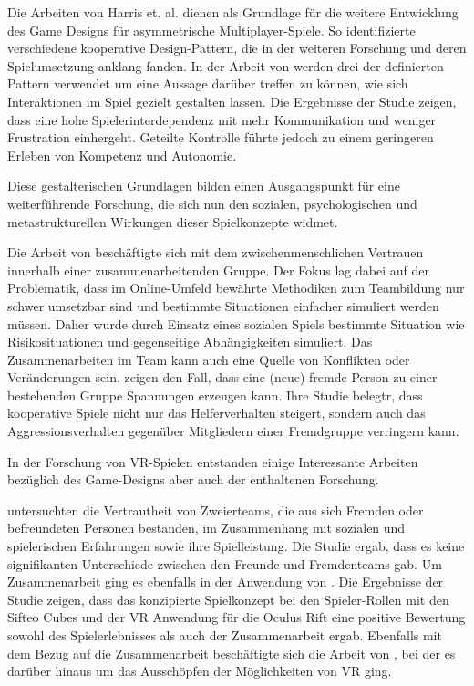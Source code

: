 Die Arbeiten von Harris et. al. dienen als Grundlage für die weitere Entwicklung des Game Designs für asymmetrische Multiplayer-Spiele. So identifizierte \cite{guimaraes_rocha_game_2008} verschiedene kooperative Design-Pattern, die in der weiteren Forschung und deren Spielumsetzung anklang fanden. In der Arbeit von \cite{emmerich_impact_2017} werden drei der definierten Pattern verwendet um eine Aussage darüber treffen zu können, wie sich Interaktionen im Spiel gezielt gestalten lassen. Die Ergebnisse der Studie zeigen, dass eine hohe Spielerinterdependenz mit mehr Kommunikation und weniger Frustration einhergeht. Geteilte Kontrolle führte jedoch zu einem geringeren Erleben von Kompetenz und Autonomie.

Diese gestalterischen Grundlagen bilden einen Ausgangspunkt für eine weiterführende Forschung, die sich nun den sozialen, psychologischen und metastrukturellen Wirkungen dieser Spielkonzepte widmet.

Die Arbeit von \cite{depping_trust_2016} beschäftigte sich mit dem zwischenmenschlichen Vertrauen innerhalb einer zusammenarbeitenden Gruppe. Der Fokus lag dabei auf der Problematik, dass im Online-Umfeld bewährte Methodiken zum Teambildung nur schwer umsetzbar sind und bestimmte Situationen einfacher simuliert werden müssen. Daher wurde durch Einsatz eines sozialen Spiels bestimmte Situation wie Risikosituationen und gegenseitige Abhängigkeiten simuliert. Das Zusammenarbeiten im Team kann auch eine Quelle von Konflikten oder Veränderungen sein. \cite{velez_ingroup_2014} zeigen den Fall, dass eine (neue) fremde Person zu einer bestehenden Gruppe Spannungen erzeugen kann. Ihre Studie belegtr, dass kooperative Spiele nicht nur das Helferverhalten steigert, sondern auch das Aggressionsverhalten gegenüber Mitgliedern einer Fremdgruppe verringern kann.

In der Forschung von \ac{VR}-Spielen entstanden einige Interessante Arbeiten bezüglich des Game-Designs aber auch der enthaltenen Forschung.

\cite{karaosmanoglu_playing_2023} untersuchten die Vertrautheit von Zweierteams, die aus sich Fremden oder befreundeten Personen bestanden, im Zusammenhang mit sozialen und spielerischen Erfahrungen sowie ihre Spielleistung. Die Studie ergab, dass es keine signifikanten Unterschiede zwischen den Freunde und Fremdenteams gab. Um Zusammenarbeit ging es ebenfalls in der Anwendung von \cite{sajjadi_maze_2014}. Die Ergebnisse der Studie zeigen, dass das konzipierte Spielkonzept bei den Spieler-Rollen mit den Sifteo Cubes und der VR Anwendung für die Oculus Rift eine positive Bewertung sowohl des Spielerlebnisses als auch der Zusammenarbeit ergab. Ebenfalls mit dem Bezug auf die Zusammenarbeit beschäftigte sich die Arbeit von \cite{smilovitch_birdquestvr_2019}, bei der es darüber hinaus um das Ausschöpfen der Möglichkeiten von \ac{VR} ging.

